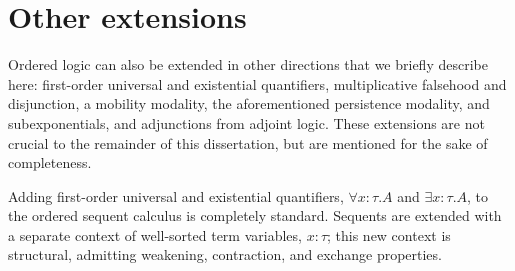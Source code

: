 \section{Other extensions}\label{sec:ordered-logic:extensions}

Ordered logic can also be extended in other directions that we briefly describe here:
first-order universal and existential quantifiers,
 multiplicative falsehood and disjunction, %
 a mobility modality, %
 the aforementioned persistence modality, and
 subexponentials, %
 and adjunctions from adjoint logic. %
These extensions are not crucial to the remainder of this dissertation, but are mentioned for the sake of completeness.


Adding first-order universal and existential quantifiers, $\forall x{:}\tau.A$ and $\exists x{:}\tau.A$, to the ordered sequent calculus is completely standard.
Sequents are extended with a separate context of well-sorted term variables, $x{:}\tau$; this new context is structural, admitting weakening, contraction, and exchange properties.


